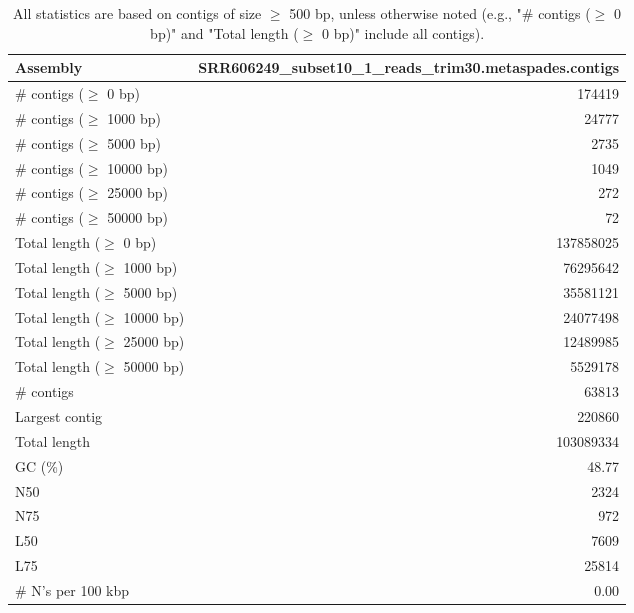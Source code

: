 \documentclass[12pt,a4paper]{article}
\begin{document}
\begin{table}[ht]
\begin{center}
\caption{All statistics are based on contigs of size $\geq$ 500 bp, unless otherwise noted (e.g., "\# contigs ($\geq$ 0 bp)" and "Total length ($\geq$ 0 bp)" include all contigs).}
\begin{tabular}{|l*{1}{|r}|}
\hline
Assembly & SRR606249\_subset10\_1\_reads\_trim30.metaspades.contigs \\ \hline
\# contigs ($\geq$ 0 bp) & 174419 \\ \hline
\# contigs ($\geq$ 1000 bp) & 24777 \\ \hline
\# contigs ($\geq$ 5000 bp) & 2735 \\ \hline
\# contigs ($\geq$ 10000 bp) & 1049 \\ \hline
\# contigs ($\geq$ 25000 bp) & 272 \\ \hline
\# contigs ($\geq$ 50000 bp) & 72 \\ \hline
Total length ($\geq$ 0 bp) & 137858025 \\ \hline
Total length ($\geq$ 1000 bp) & 76295642 \\ \hline
Total length ($\geq$ 5000 bp) & 35581121 \\ \hline
Total length ($\geq$ 10000 bp) & 24077498 \\ \hline
Total length ($\geq$ 25000 bp) & 12489985 \\ \hline
Total length ($\geq$ 50000 bp) & 5529178 \\ \hline
\# contigs & 63813 \\ \hline
Largest contig & 220860 \\ \hline
Total length & 103089334 \\ \hline
GC (\%) & 48.77 \\ \hline
N50 & 2324 \\ \hline
N75 & 972 \\ \hline
L50 & 7609 \\ \hline
L75 & 25814 \\ \hline
\# N's per 100 kbp & 0.00 \\ \hline
\end{tabular}
\end{center}
\end{table}
\end{document}
